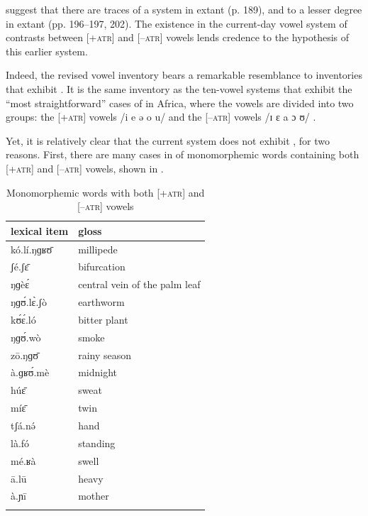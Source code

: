 \documentclass[output=paper,colorlinks,citecolor=brown]{langscibook}
\begin{document}
\citeauthor{BoyeldieuCloarec-Heiss2001} suggest that there are traces of a   system in extant  (p. 189), and to a lesser degree in extant  (pp. 196–197, 202). The existence in the current-day  vowel system of contrasts between [+\textsc{atr}] and [–\textsc{atr}] vowels lends credence to the hypothesis of this earlier  system.

Indeed, the revised  vowel inventory bears a remarkable resemblance to inventories that exhibit . It is the same inventory as the ten-vowel systems that exhibit the “most straightforward” cases of  in Africa, where the vowels are divided into two groups: the [+\textsc{atr}] vowels /i e ə o u/ and the [–\textsc{atr}] vowels /ɪ ɛ a ɔ ʊ/ \citep[499]{Casali2008}.

Yet, it is relatively clear that the current  system does not exhibit , for two reasons. First, there are many cases in  of monomorphemic words containing both [+\textsc{atr}] and [–\textsc{atr}] vowels, shown in .

\begin{table}
\caption{Monomorphemic words with both [+\textsc{atr}] and [–\textsc{atr}] vowels}
\label{tab:olson:15}
    \begin{tabular}{ll}
    \lsptoprule
        lexical item & gloss\\
    \midrule
        kó.lí.ŋɡʁʊ̄ & millipede\\
        ʃé.ʃɛ̄ & bifurcation\\
        ŋɡèɛ́ & central vein of the palm leaf\\
        ŋɡʊ́.lɛ̀.ʃò & earthworm\\
        kʊ́ɛ́.ló & bitter plant\\
        ŋɡʊ́.wò & smoke\\
        zō.ŋɡʊ̄ & rainy season\\
        à.ɡʁʊ́.mè & midnight\\
        húɛ̄ & sweat\\
        míɛ̄ & twin\\
        tʃá.nə́ & hand\\
        là.fó & standing\\
        mé.ʁà & swell\\
        ā.lū & heavy\\
        à.ɲī & mother\\
    \lspbottomrule
    \end{tabular}
\end{table}
\end{document}
